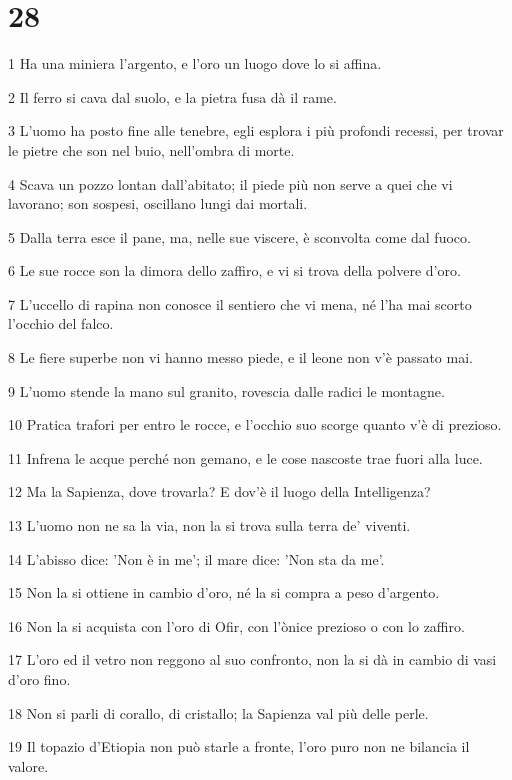 \chapter{28}

\par 1 Ha una miniera l'argento, e l'oro un luogo dove lo si affina.
\par 2 Il ferro si cava dal suolo, e la pietra fusa dà il rame.
\par 3 L'uomo ha posto fine alle tenebre, egli esplora i più profondi recessi, per trovar le pietre che son nel buio, nell'ombra di morte.
\par 4 Scava un pozzo lontan dall'abitato; il piede più non serve a quei che vi lavorano; son sospesi, oscillano lungi dai mortali.
\par 5 Dalla terra esce il pane, ma, nelle sue viscere, è sconvolta come dal fuoco.
\par 6 Le sue rocce son la dimora dello zaffiro, e vi si trova della polvere d'oro.
\par 7 L'uccello di rapina non conosce il sentiero che vi mena, né l'ha mai scorto l'occhio del falco.
\par 8 Le fiere superbe non vi hanno messo piede, e il leone non v'è passato mai.
\par 9 L'uomo stende la mano sul granito, rovescia dalle radici le montagne.
\par 10 Pratica trafori per entro le rocce, e l'occhio suo scorge quanto v'è di prezioso.
\par 11 Infrena le acque perché non gemano, e le cose nascoste trae fuori alla luce.
\par 12 Ma la Sapienza, dove trovarla? E dov'è il luogo della Intelligenza?
\par 13 L'uomo non ne sa la via, non la si trova sulla terra de' viventi.
\par 14 L'abisso dice: 'Non è in me'; il mare dice: 'Non sta da me'.
\par 15 Non la si ottiene in cambio d'oro, né la si compra a peso d'argento.
\par 16 Non la si acquista con l'oro di Ofir, con l'ònice prezioso o con lo zaffiro.
\par 17 L'oro ed il vetro non reggono al suo confronto, non la si dà in cambio di vasi d'oro fino.
\par 18 Non si parli di corallo, di cristallo; la Sapienza val più delle perle.
\par 19 Il topazio d'Etiopia non può starle a fronte, l'oro puro non ne bilancia il valore.
